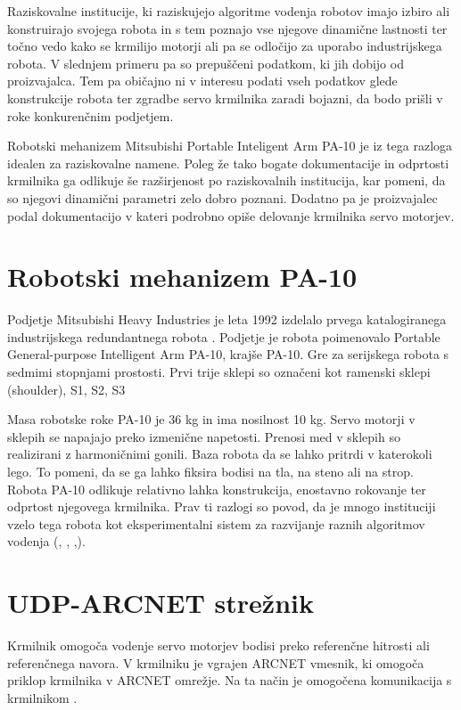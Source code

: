 \documentclass[a4paper]{article}
\begin{document}
Raziskovalne institucije, ki raziskujejo algoritme vodenja robotov imajo izbiro ali konstruirajo svojega robota in s tem poznajo vse njegove dinamične lastnosti ter točno vedo kako se krmilijo motorji ali pa se odločijo za uporabo industrijskega robota. V slednjem primeru pa so prepuščeni podatkom, ki jih dobijo od proizvajalca. Tem pa običajno ni v interesu podati vseh podatkov glede konstrukcije robota ter zgradbe servo krmilnika zaradi bojazni, da bodo prišli v roke konkurenčnim podjetjem.

Robotski mehanizem Mitsubishi Portable Inteligent Arm PA-10 je iz tega razloga idealen za raziskovalne namene. Poleg že tako bogate dokumentacije in odprtosti krmilnika ga odlikuje še razširjenost po raziskovalnih institucija, kar pomeni, da so njegovi dinamični parametri zelo dobro poznani. Dodatno pa je proizvajalec podal dokumentacijo v kateri podrobno opiše delovanje krmilnika servo motorjev. 


\section{Robotski mehanizem PA-10}

Podjetje Mitsubishi Heavy Industries je leta 1992 izdelalo prvega katalogiranega industrijskega redundantnega robota \cite{mhi_pa10}. Podjetje je robota poimenovalo Portable General-purpose Intelligent Arm PA-10, krajše PA-10. Gre za serijskega robota s sedmimi stopnjami prostosti. Prvi trije sklepi so označeni kot ramenski sklepi (shoulder), S1, S2, S3

Masa robotske roke PA-10 je 36 kg in ima nosilnost 10 kg. Servo motorji v sklepih se napajajo preko izmenične napetosti. Prenosi med v sklepih so realizirani z harmoničnimi gonili. Baza robota da se lahko pritrdi v katerokoli lego. To pomeni, da se ga lahko fiksira bodisi na tla, na steno ali na strop. Robota PA-10 odlikuje relativno lahka konstrukcija, enostavno rokovanje ter odprtost njegovega krmilnika. Prav ti razlogi so povod, da je mnogo instituciji vzelo tega robota kot eksperimentalni sistem za razvijanje raznih algoritmov vodenja (\cite{voung_pa10}, \cite{aalst_pa10}, \cite{rodrigo_pa10},\cite{petric_nevronska}).

\section{UDP-ARCNET strežnik}

Krmilnik omogoča vodenje servo motorjev bodisi preko referenčne hitrosti ali referenčnega navora. V krmilniku je vgrajen ARCNET vmesnik, ki omogoča priklop krmilnika v ARCNET omrežje. Na ta način je omogočena komunikacija s krmilnikom \cite{pa10-manual}.
\end{document}
